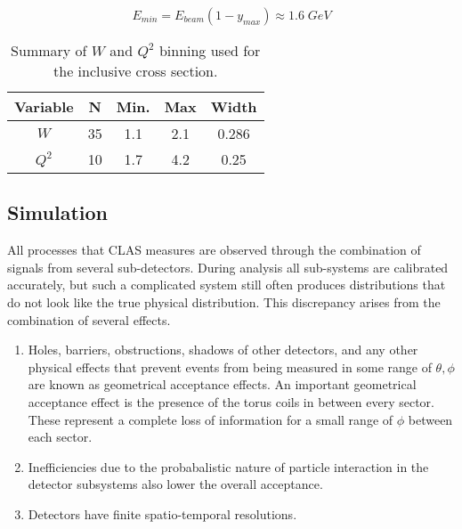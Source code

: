 \begin{equation}
	E_{min} = E_{beam}(1-y_{max}) \approx 1.6 \; GeV  
\end{equation}   


\begin{table}
  \centering
  \begin{tabular}{c|c|c|c|c}
    Variable & N & Min. & Max & Width \\
    \hline 
    $W$   & 35 & 1.1 & 2.1 & 0.286 \\
    $Q^2$ & 10 & 1.7 & 4.2 & 0.25
  \end{tabular}
  \caption{Summary of $W$ and $Q^2$ binning used for the inclusive cross section.}
\end{table}

\subsection{Simulation}
All processes that CLAS measures are observed through the combination of signals from several sub-detectors.  During analysis all sub-systems are calibrated accurately, but such a complicated system still often produces distributions that do not look like the true physical distribution.  This discrepancy arises from the combination of several effects.

\begin{enumerate}
	\item Holes, barriers, obstructions, shadows of other detectors, and any other physical effects that prevent events from being measured in some range of $\theta, \phi$ are known as geometrical acceptance effects.  An important geometrical acceptance effect is the presence of the torus coils in between every sector.  These represent a complete loss of information for a small range of $\phi$ between each sector.
	\item Inefficiencies due to the probabalistic nature of particle interaction in the detector subsystems also lower the overall acceptance.  
	\item Detectors have finite spatio-temporal resolutions.  
\end{enumerate}

